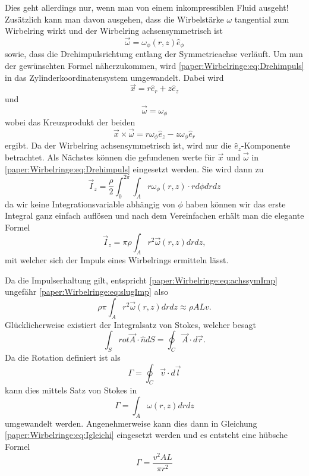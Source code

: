 Dies geht allerdings nur, wenn man von einem inkompressiblen Fluid ausgeht!
Zusätzlich kann man davon ausgehen, dass die Wirbelstärke $\omega$ tangential zum Wirbelring wirkt und der Wirbelring achsensymmetrisch ist
\begin{equation*}
    \vec{\omega} = \omega_\phi(r,z)\hat{e}_\phi
\end{equation*}
sowie, dass die Drehimpulsrichtung entlang der Symmetrieachse verläuft.
Um nun der gewünschten Formel näherzukommen, wird \ref{paper:Wirbelringe:eq:Drehimpuls} in das Zylinderkoordinatensystem umgewandelt.
Dabei wird
\begin{equation*}
    \vec{x} = r\hat{e}_r + z\hat{e}_z
\end{equation*}
und
\begin{equation*}
    \vec{\omega} = \omega_\phi
\end{equation*}
wobei das Kreuzprodukt der beiden 
\begin{equation*}
    \vec{x}\times\vec{\omega} = r\omega_\phi\hat{e}_z - z\omega_\phi\hat{e}_r
\end{equation*}
ergibt. Da der Wirbelring achsensymmetrisch ist, wird nur die $\hat{e}_z$-Komponente betrachtet.
Als Nächstes können die gefundenen werte für $\vec{x}$ und $\vec{\omega}$ in \ref{paper:Wirbelringe:eq:Drehimpuls} eingesetzt werden.
Sie wird dann zu
\begin{equation*}
    \vec{I}_z = \frac{\rho}{2}\int_{0}^{2\pi}\int_{A}r\omega_\phi(r,z)\cdot rd\phi drdz
\end{equation*}
da wir keine Integrationsvariable abhängig von $\phi$ haben können wir das erste Integral ganz einfach auflösen und nach dem Vereinfachen erhält man die elegante Formel
\begin{equation}
    \vec{I}_z = \pi\rho\int_{A}r^2\vec{\omega}(r,z)drdz
    \label{paper:Wirbelringe:eq:achssymImp},
\end{equation}
mit welcher sich der Impuls eines Wirbelrings ermitteln lässt.

Da die Impulserhaltung gilt, entspricht \ref{paper:Wirbelringe:eq:achssymImp} ungefähr \ref{paper:Wirbelringe:eq:slugImp} also
\begin{equation*}
    \rho\pi\int_{A}r^2\vec{\omega}(r,z)drdz \approx \rho ALv.
    \label{paper:Wirbelringe:eq:Igleichi}
\end{equation*}
Glücklicherweise existiert der Integralsatz von Stokes, welcher besagt
\begin{equation*}
    \int_{S}rot\vec{A}\cdot\hat{n}dS = \oint_{C}\vec{A}\cdot d\vec{r}.
\end{equation*}
Da die Rotation definiert ist als 
\begin{equation*}
    \Gamma = \oint_{C}\vec{v}\cdot d\vec{l}
\end{equation*}
kann dies mittels Satz von Stokes in
\begin{equation*}
    \Gamma = \int_{A}\omega(r,z)drdz
\end{equation*}
umgewandelt werden.
Angenehmerweise kann dies dann in Gleichung \ref{paper:Wirbelringe:eq:Igleichi} eingesetzt werden und es entsteht eine hübsche Formel
\begin{equation*}
    \Gamma = \frac{v^2AL}{\pi r^2}
\end{equation*}